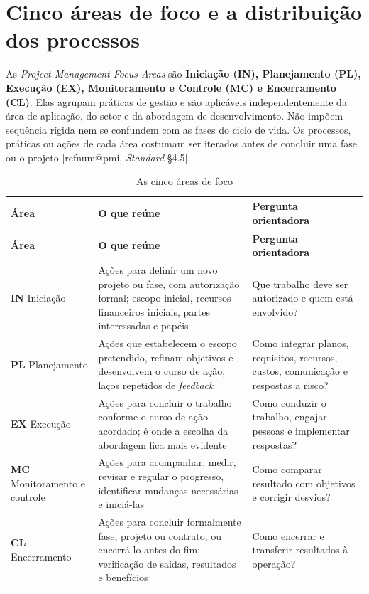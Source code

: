 \documentclass[11pt,a4paper]{article}
\makeatletter
\newcommand{\refnum}[1]{\csname refnum@#1\endcsname}
\newcommand{\cit}[1]{[\refnum{#1}]}
\newcommand{\SingleSpacing}{}
\newcommand{\fontetab}[1]{\par\vspace{3pt}{\small\noindent Fonte: #1\par}}
\makeatother
\begin{document}
\section{Cinco áreas de foco e a distribuição dos processos}

As \textit{Project Management Focus Areas} são \textbf{Iniciação (IN), Planejamento (PL), Execução (EX), Monitoramento e Controle (MC) e Encerramento (CL)}. Elas agrupam práticas de gestão e são aplicáveis independentemente da área de aplicação, do setor e da abordagem de desenvolvimento. Não impõem sequência rígida nem se confundem com as fases do ciclo de vida. Os processos, práticas ou ações de cada área costumam ser iterados antes de concluir uma fase ou o projeto [\refnum{pmi}, \textit{Standard} §4.5].

\begingroup\SingleSpacing\small
\begin{longtable}{@{}>{\raggedright\arraybackslash}p{}>{\raggedright\arraybackslash}p{}>{\raggedright\arraybackslash}p{}@{}}
\caption{As cinco áreas de foco}\label{tab:t6}\\
\toprule
\textbf{Área} & \textbf{O que reúne} & \textbf{Pergunta orientadora}\\
\midrule
\endfirsthead
\toprule
\textbf{Área} & \textbf{O que reúne} & \textbf{Pergunta orientadora}\\
\midrule
\endhead
\bottomrule
\endfoot
\bottomrule
\endlastfoot
\textbf{IN} Iniciação & Ações para definir um novo projeto ou fase, com autorização formal; escopo inicial, recursos financeiros iniciais, partes interessadas e papéis & Que trabalho deve ser autorizado e quem está envolvido?\\[3pt]
\textbf{PL} Planejamento & Ações que estabelecem o escopo pretendido, refinam objetivos e desenvolvem o curso de ação; laços repetidos de \textit{feedback} & Como integrar planos, requisitos, recursos, custos, comunicação e respostas a risco?\\[3pt]
\textbf{EX} Execução & Ações para concluir o trabalho conforme o curso de ação acordado; é onde a escolha da abordagem fica mais evidente & Como conduzir o trabalho, engajar pessoas e implementar respostas?\\[3pt]
\textbf{MC} Monitoramento e controle & Ações para acompanhar, medir, revisar e regular o progresso, identificar mudanças necessárias e iniciá-las & Como comparar resultado com objetivos e corrigir desvios?\\[3pt]
\textbf{CL} Encerramento & Ações para concluir formalmente fase, projeto ou contrato, ou encerrá-lo antes do fim; verificação de saídas, resultados e benefícios & Como encerrar e transferir resultados à operação?\\[3pt]
\end{longtable}
\endgroup
\fontetab{Elaborado pelos autores (2026), com base em \cit{pmi}.}
\end{document}
